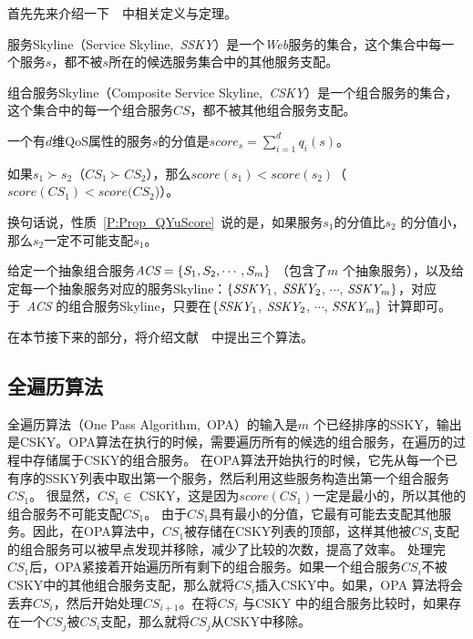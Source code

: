 首先先来介绍一下~\cite{yu2013efficient}~中相关定义与定理。

\begin{definition}[服务Skyline]
服务Skyline（Service Skyline,~\emph{SSKY}）是一个\emph{Web}服务的集合，这个集合中每一个服务$s$，都不被$s$所在的候选服务集合中的其他服务支配。
\end{definition}

\begin{definition}[组合服务Skyline]
组合服务Skyline（Composite Service Skyline,~\emph{CSKY}）是一个组合服务的集合，这个集合中的每一个组合服务$CS$，都不被其他组合服务支配。
\end{definition}

\begin{definition}[服务分值]
一个有$d$维QoS属性的服务$s$的分值是$score_{s}=\sum_{i=1}^{d}q_{i}(s)$。
\end{definition}

\begin{property}[]\label{P:Prop_QYuScore}
如果$s_{1} \succ s_{2}$（$CS_{1} \succ CS_{2}$），那么$score(s_{1}) < score(s_{2})$（$score(CS_{1}) < score(CS_{2}$)）。
\end{property}

换句话说，性质~\ref{P:Prop_QYuScore}~说的是，如果服务$s_{1}$的分值比$s_{2}$ 的分值小，那么$s_{2}$一定不可能支配$s_{1}$。

\begin{theorem}[局部搜索策略]\label{TH:Theo_LocalStratey}
给定一个抽象组合服务$\emph{ACS}=\{S_{1}, S_{2}, \cdots, S_{m}\}$ （包含了$m$ 个抽象服务），以及给定每一个抽象服务对应的服务Skyline：$\{\emph{SSKY}_{1}$, $\emph{SSKY}_{2}$, $\cdots$, $\emph{SSKY}_{m}\}$，对应于~\emph{ACS} 的组合服务Skyline，只要在$\{\emph{SSKY}_{1}$, $\emph{SSKY}_{2}$, $\cdots$, $\emph{SSKY}_{m}\}$ 计算即可。
\end{theorem}

在本节接下来的部分，将介绍文献~\cite{yu2013efficient}~中提出三个算法。

\subsection{全遍历算法}

全遍历算法（One Pass Algorithm,~OPA）的输入是$m$ 个已经排序的SSKY，输出是CSKY。OPA算法在执行的时候，需要遍历所有的候选的组合服务，在遍历的过程中存储属于CSKY的组合服务。
在OPA算法开始执行的时候，它先从每一个已有序的SSKY列表中取出第一个服务，然后利用这些服务构造出第一个组合服务$CS_{1}$。 很显然，$CS_{1} \in$ CSKY，这是因为$score(CS_{1})$一定是最小的，所以其他的组合服务不可能支配$CS_{1}$。
由于$CS_{1}$具有最小的分值，它最有可能去支配其他服务。因此，在OPA算法中，$CS_{1}$被存储在CSKY列表的顶部，这样其他被$CS_{1}$支配的组合服务可以被早点发现并移除，减少了比较的次数，提高了效率。
处理完$CS_{1}$后，OPA紧接着开始遍历所有剩下的组合服务。如果一个组合服务$CS_{i}$不被CSKY中的其他组合服务支配，那么就将$CS_{i}$插入CSKY中。如果，OPA 算法将会丢弃$CS_{i}$，然后开始处理$CS_{i+1}$。在将$CS_{i}$ 与CSKY 中的组合服务比较时，如果存在一个$CS_{j}$被$CS_{i}$支配，那么就将$CS_{j}$从CSKY中移除。

